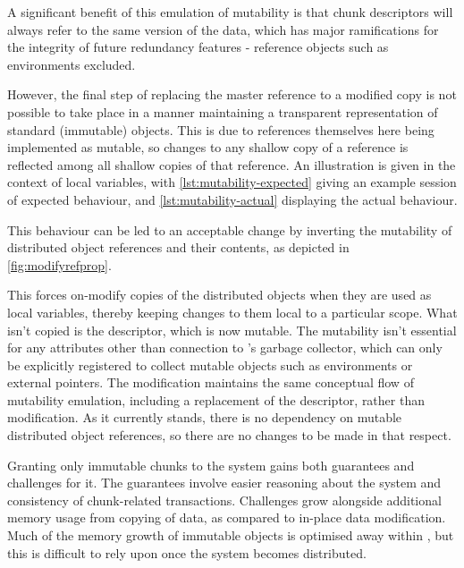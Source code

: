 
A significant benefit of this emulation of mutability is that chunk descriptors will always refer to the same version of the data, which has major ramifications for the integrity of future redundancy features - reference objects such as environments excluded.

However, the final step of replacing the master reference to a modified copy is not possible to take place in a manner maintaining a transparent representation of standard (immutable) \R{} objects.
This is due to references themselves here being implemented as mutable, so changes to any shallow copy of a reference is reflected among all shallow copies of that reference.
An illustration is given in the context of local variables, with \cref{lst:mutability-expected} giving an example \R{} session of expected behaviour, and \cref{lst:mutability-actual} displaying the actual behaviour.




This behaviour can be led to an acceptable change by inverting the mutability of distributed object references and their contents, as depicted in \cref{fig:modifyrefprop}.


This forces on-modify copies of the distributed objects when they are used as local variables, thereby keeping changes to them local to a particular scope.
What isn't copied is the descriptor, which is now mutable.
The mutability isn't essential for any attributes other than connection to \R{}'s garbage collector, which can only be explicitly registered to collect mutable objects such as environments or external pointers.
The modification maintains the same conceptual flow of mutability emulation, including a replacement of the descriptor, rather than modification.
As it currently stands, there is no \lsr{} dependency on mutable distributed object references, so there are no changes to be made in that respect.

Granting only immutable chunks to the \lsr{} system gains both guarantees and challenges for it.
The guarantees involve easier reasoning about the system and consistency of chunk-related transactions\cite{goetz2006java}.
Challenges grow alongside additional memory usage from copying of data, as compared to in-place data modification.
Much of the memory growth of immutable objects is optimised away within \R{}, but this is difficult to rely upon once the system becomes distributed\cite{rcore2020lang}.

